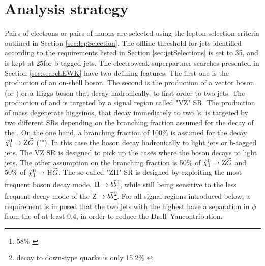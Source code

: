 \section{Analysis strategy}      
\noindent
\justify
Pairs of electrons or pairs of muons are selected using the lepton selection criteria outlined in Section \ref{sec:lepSelection}.
The offline \pt threshold for jets identified according to the requirements listed in Section \ref{sec:jetSelections} is set to 35\GeV, and is kept at 25\GeV for b-tagged jets.
The electroweak superpartner searches presented in Section \ref{sec:searchEWK} have two defining features. 
The first one is the production of an on-shell \PZ boson.
The second is the production of a vector boson (\PW or \PZ) or a Higgs boson that decay hadronically, to first order to two jets. 
The production of \firstcharg and \PSGczDt is targeted by a signal region called "VZ" SR. 
The production of mass degenerate higgsinos, that decay immediately to two \PSGczDo's, is targeted by two different SRs depending on the branching fraction assumed for the decay of the \PSGczDo.
On the one hand, a branching fraction of 100\% is assumed for the decay $\widetilde{\chi}^{0}_{1}\rightarrow\mathrm{Z}\widetilde{G}$ ("\PZZ").  
In this case the \PZ boson decay hadronically to light jets or b-tagged jets. The VZ SR is designed to pick up the cases where the \PZ boson decays to light jets.
The other assumption on the branching fraction is 50\% of $\widetilde{\chi}^{0}_{1}\rightarrow\mathrm{Z}\widetilde{G}$ and 50\% of $\widetilde{\chi}^{0}_{1}\rightarrow\mathrm{H}\widetilde{G}$. 
The so called "ZH" SR is designed by exploiting the most frequent \PH boson decay mode, $\mathrm{H}\rightarrow b\bar{b}$\footnote{58\% \cite{deFlorian:2016spz}}, while still being sensitive to the less frequent decay mode of the $\mathrm{Z}\rightarrow b\bar{b}$\footnote{\PZ decay to down-type quarks is only 15.2\% \cite{PhysRevD.98.030001}}.   
For all signal regions introduced below, a requirement is imposed that the two jets with the highest \pt have a separation in $\phi$ from the \ptmiss of at least 0.4, in order to reduce the Drell--Yancontribution.

